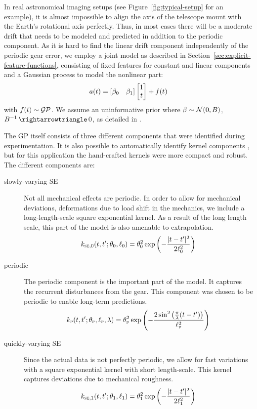 In real astronomical imaging setups (see Figure~\ref{fig:typical-setup}
for an example), it is almost impossible to align the axis of the telescope
mount with the Earth's rotational axis perfectly. Thus, in most cases there will
be a moderate drift that needs to be modeled and predicted in addition to the
periodic component. As it is hard to find the linear drift component
independently of the periodic gear error, we employ a joint model as described
in Section~\ref{sec:explicit-feature-functions}, consisting of fixed features
for constant and linear components and a Gaussian process to model the nonlinear
part:
\begin{equation}
 a(t) = [\beta_0\quad \beta_1]
  \begin{bmatrix}1\\t\end{bmatrix} + f(t)
\end{equation}
with $f(t)\sim\mathcal{GP}$. We assume an uninformative prior where $\beta\sim\mathcal{N}(0,B)$,
$B\inv\to 0$, as detailed in \cite[]{Rasmussen.Williams:2006:Gaussian}.

The GP itself consists of three different components that were identified
during experimentation. It is also possible to automatically identify kernel
components \cite{Duvenaud.Lloyd.ea:2013:Structure}, but for this application
the hand-crafted kernels were more compact and robust. The different components
are:
\begin{description}
  \item[slowly-varying SE] Not all mechanical effects are periodic.
    In order to allow for mechanical deviations, \eg deformations due to load
    shift in the mechanics, we include a long-length-scale square exponential
    kernel. As a result of the long length scale, this part of the model is
    also amenable to extrapolation.
    \begin{equation}
      k_{{\normalfont\textsc{se}},0}(t, t'; \theta_0, \ell_0) = \theta^2_0
      \exp\left(- \frac{|t-t'|^2}{2\ell^2_0}\right)
    \end{equation}
  \item[periodic] The periodic component is the important part of the model. It
    captures the recurrent disturbances from the gear. This component was chosen
    to be periodic to enable long-term predictions.
    \begin{equation}
      k_{\normalfont\textsc{p}}(t,t';\theta_{\normalfont\textsc{p}},\ell_{\normalfont\textsc{p}},\lambda) =
      \theta^2_{\normalfont\textsc{p}}
      \exp\left(-\frac{2\sin^2\left(\frac{\pi}{\lambda}
      (t-t')\right)}{\ell^2_{\normalfont\textsc{p}}}\right)
    \end{equation}
  \item[quickly-varying SE] Since the actual data is not perfectly periodic, we
    allow for fast variations with a square exponential kernel with short
    length-scale. This kernel captures deviations due to mechanical
    roughness.
    \begin{equation}
      k_{{\normalfont\textsc{se}},1}(t, t'; \theta_1, \ell_1) = \theta^2_1
      \exp\left(-\frac{|t-t'|^2}{2\ell^2_1}\right)
    \end{equation}
\end{description}

